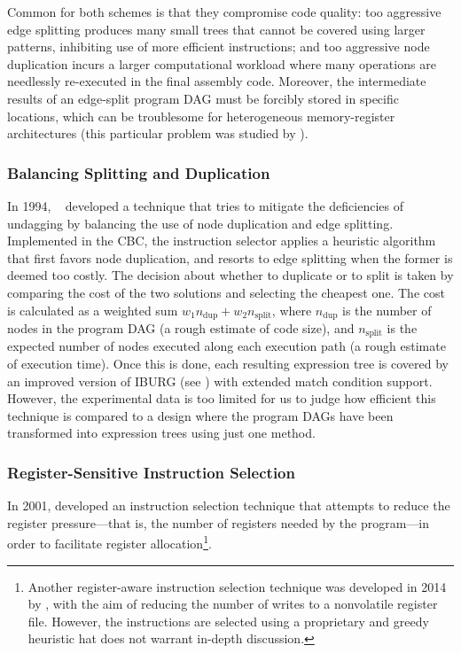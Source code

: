 Common for both schemes is that they compromise code quality: too aggressive
\gls{edge splitting} produces many small \glspl{tree} that cannot be covered
using larger \glspl{pattern}, inhibiting use of more efficient
\glspl{instruction}; and too aggressive \gls{node duplication} incurs a larger
computational workload where many operations are needlessly re-executed in the
final \gls{assembly code}.
%
Moreover, the intermediate results of an edge-split
\gls{program DAG} must be forcibly stored in specific locations, which can be
troublesome for heterogeneous memory-\gls{register} architectures (this
particular problem was studied by \textcite{Araujo1996}).


\subsubsection{Balancing Splitting and Duplication}

In 1994, \citeauthor{Fauth1994}~\cite{Fauth1994, Muller1994} developed a
technique that tries to mitigate the deficiencies of \gls{undagging} by
balancing the use of \gls{node duplication} and \gls{edge
  splitting}.
%
Implemented in the \gls{CBC}, the \gls{instruction selector}
applies a heuristic algorithm that first favors \gls{node duplication}, and
resorts to \gls{edge splitting} when the former is deemed too costly.
%
The
decision about whether to duplicate or to split is taken by comparing the cost
of the two solutions and selecting the cheapest one.
%
The cost is calculated as a
weighted sum \mbox{$w_1 n_{\text{dup}} + w_2 n_{\text{split}}$}, where
$n_{\text{dup}}$ is the number of \glspl{node} in the \gls{program DAG} (a rough
estimate of code size), and $n_{\text{split}}$ is the expected number of
\glspl{node} executed along each execution path (a rough estimate of execution
time).
%
Once this is done, each resulting \gls{expression tree} is covered by an
improved version of \gls{IBURG} (see ) with extended match
condition support.
%
However, the experimental data is too limited for us to judge
how efficient this technique is compared to a design where the \glspl{program
  DAG} have been transformed into \glspl{expression tree} using just one method.


\subsubsection{Register-Sensitive Instruction Selection}

In 2001, \textcite{Sarkar2001} developed an \gls{instruction selection}
technique that attempts to reduce the \gls{register pressure}---that is, the
number of \glspl{register} needed by the \gls{program}---in order to facilitate
\gls{register allocation}\footnote{Another register-aware \gls{instruction
    selection} technique was developed in 2014 by \textcite{Xie2014}, with the
  aim of reducing the number of writes to a nonvolatile \gls{register}
  file.
%
However, the \glspl{instruction} are selected using a proprietary and
  greedy heuristic hat does not warrant in-depth discussion.}.


